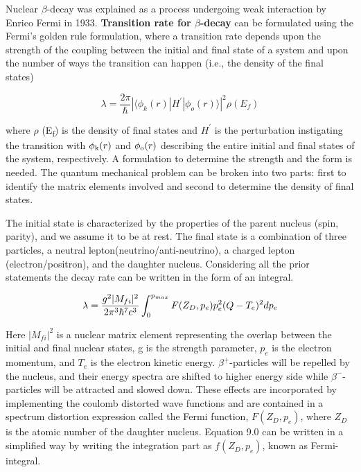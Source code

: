 Nuclear $\beta$-decay was explained as a process undergoing weak interaction by Enrico Fermi \citep{fermitheory} in 1933. \textbf{Transition rate for $\beta$-decay} can be formulated using the Fermi's golden rule formulation, where a transition rate depends upon the strength of the coupling between the initial and final state of a system and upon the number of ways the transition can happen (i.e., the density of the final states)

\begin{equation}
\lambda = \frac{2\pi}{\hbar}|\langle\phi_{k}(r)|H^{'}|\phi_{o}(r)\rangle|^2\rho(E_{f})
\end{equation}

where $\rho$ (E\textsubscript{f}) is the density of final states and $H^{'}$ is the perturbation instigating the transition with $\phi\textsubscript{k}(r)$ and $\phi\textsubscript{o}(r)$ describing the entire initial and final states of the system, respectively. A formulation to determine the strength and the form is needed. The quantum mechanical problem can be broken into two parts: first to identify the matrix elements involved and second to determine the density of final states.

The initial state is characterized by the properties of the parent nucleus (spin, parity), and we assume it to be at rest. The final state is a combination of three particles, a neutral lepton(neutrino/anti-neutrino), a charged lepton (electron/positron), and the daughter nucleus. Considering all the prior statements the decay rate can be written in the form of an integral.

\begin{equation}
\lambda = \frac{g^2 |M_{fi}|\textsuperscript{2}}{2\pi^3\hbar^7c^3}\int_{0}^{p_{max}} F(Z_{D},p_{e})p_{e}^2(Q-T_{e})^2dp_{e}
\end{equation}

Here $|M_{fi}|^2$ is a nuclear matrix element representing the overlap between the initial and final	
nuclear states, g is the strength parameter, $p_{e}$ is the electron momentum, and $T_{e}$ is the electron kinetic energy. $\beta^{+}$-particles will be repelled by the nucleus, and their energy spectra are shifted to higher energy side while $\beta^{-}$-particles will be attracted and slowed down. These effects are incorporated by implementing the coulomb distorted wave functions and are contained in a spectrum distortion expression called the Fermi function, $F(Z_{D},p_{e})$, where $Z_{D}$ is the atomic number of the daughter nucleus. Equation 9.0 can be written in a simplified way by writing the integration part as $f(Z_{D},p_{e})$, known as Fermi-integral. 

